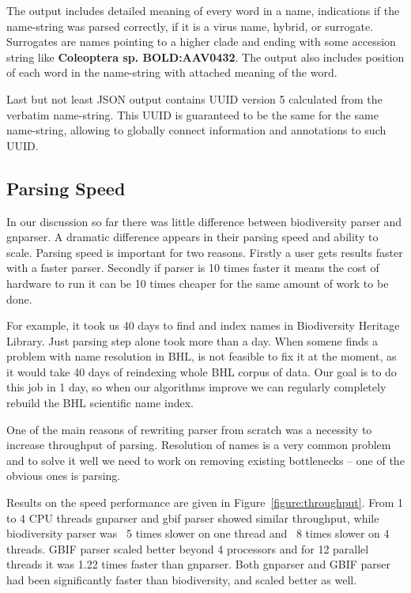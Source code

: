 \documentclass{bmcart}
\begin{document}
The output includes detailed meaning of every word in a name, indications if
the name-string was parsed correctly, if it is a virus name, hybrid, or
surrogate. Surrogates are names pointing to a higher clade and ending with
some accession string like \textbf{Coleoptera sp. BOLD:AAV0432}. The output
also includes position of each word in the name-string with attached meaning
of the word.

Last but not least JSON output contains UUID version 5 calculated from the
verbatim name-string. This UUID is guaranteed to be the same for the same
name-string, allowing to globally connect information and annotations to such
UUID.

\subsection*{Parsing Speed}

In our discussion so far there was little difference between biodiversity
parser and gnparser. A dramatic difference appears in their parsing speed and
ability to scale. Parsing speed is important for two reasons. Firstly a user
gets results faster with a faster parser. Secondly if parser is 10 times
faster it means the cost of hardware to run it can be 10 times cheaper for the
same amount of work to be done.

For example, it took us 40 days to find and index names in Biodiversity
Heritage Library. Just parsing step alone took more than a day. When somene
finds a problem with name resolution in BHL, is not feasible to fix it at the
moment, as it would take 40 days of reindexing whole BHL corpus of data. Our
goal is to do this job in 1 day, so when our algorithms improve we can
regularly completely rebuild the BHL scientific name index.

One of the main reasons of rewriting parser from scratch was a necessity to
increase throughput of parsing. Resolution of names is a very common problem
and to solve it well we need to work on removing existing bottlenecks -- one
of the obvious ones is parsing.

Results on the speed performance are given in Figure~\ref{figure:throughput}.
From 1 to 4 CPU threads gnparser and gbif parser showed similar throughput,
while biodiversity parser was ~5 times slower on one thread and ~8 times
slower on 4 threads. GBIF parser scaled better beyond 4 processors and for 12
parallel threads it was 1.22 times faster than gnparser. Both gnparser and
GBIF parser had been significantly faster than biodiversity, and scaled better
as well.
\end{document}
